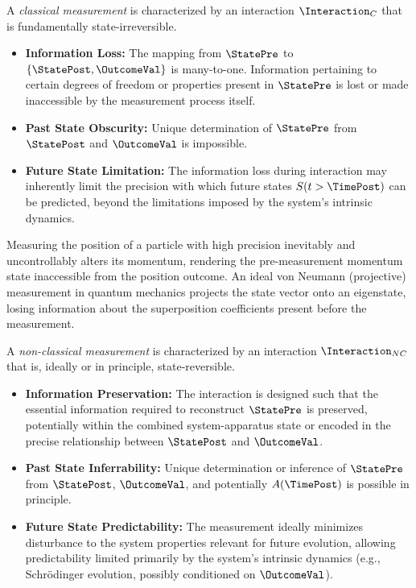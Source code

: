 	\begin{postulate} \label{post:classical}
		A \emph{classical measurement} is characterized by an interaction $\Interaction_C$ that is fundamentally state-irreversible.
		\begin{itemize}
			\item \textbf{Information Loss:} The mapping from $\StatePre$ to $\{\StatePost, \OutcomeVal\}$ is many-to-one. Information pertaining to certain degrees of freedom or properties present in $\StatePre$ is lost or made inaccessible by the measurement process itself.
			\item \textbf{Past State Obscurity:} Unique determination of $\StatePre$ from $\StatePost$ and $\OutcomeVal$ is impossible.
			\item \textbf{Future State Limitation:} The information loss during interaction may inherently limit the precision with which future states $S(t > \TimePost)$ can be predicted, beyond the limitations imposed by the system's intrinsic dynamics.
		\end{itemize}
	\end{postulate}
	
	\begin{example}
		Measuring the position of a particle with high precision inevitably and uncontrollably alters its momentum, rendering the pre-measurement momentum state inaccessible from the position outcome. An ideal von Neumann (projective) measurement in quantum mechanics projects the state vector onto an eigenstate, losing information about the superposition coefficients present before the measurement.
	\end{example}
	
	\begin{postulate} \label{post:nonclassical}
		A \emph{non-classical measurement} is characterized by an interaction $\Interaction_{NC}$ that is, ideally or in principle, state-reversible.
		\begin{itemize}
			\item \textbf{Information Preservation:} The interaction is designed such that the essential information required to reconstruct $\StatePre$ is preserved, potentially within the combined system-apparatus state or encoded in the precise relationship between $\StatePost$ and $\OutcomeVal$.
			\item \textbf{Past State Inferrability:} Unique determination or inference of $\StatePre$ from $\StatePost$, $\OutcomeVal$, and potentially $A(\TimePost)$ is possible in principle.
			\item \textbf{Future State Predictability:} The measurement ideally minimizes disturbance to the system properties relevant for future evolution, allowing predictability limited primarily by the system's intrinsic dynamics (e.g., Schr\"{o}dinger evolution, possibly conditioned on $\OutcomeVal$).
		\end{itemize}
	\end{postulate}
	
